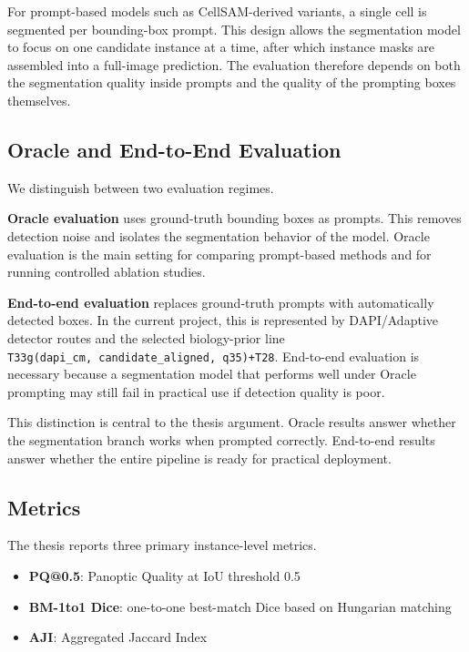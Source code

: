 For prompt-based models such as CellSAM-derived variants, a single cell is segmented per bounding-box prompt. This design allows the segmentation model to focus on one candidate instance at a time, after which instance masks are assembled into a full-image prediction. The evaluation therefore depends on both the segmentation quality inside prompts and the quality of the prompting boxes themselves.

\subsection{Oracle and End-to-End Evaluation}\label{oracle-and-end-to-end-evaluation}

We distinguish between two evaluation regimes.

\textbf{Oracle evaluation} uses ground-truth bounding boxes as prompts. This removes detection noise and isolates the segmentation behavior of the model. Oracle evaluation is the main setting for comparing prompt-based methods and for running controlled ablation studies.

\textbf{End-to-end evaluation} replaces ground-truth prompts with automatically detected boxes. In the current project, this is represented by DAPI/Adaptive detector routes and the selected biology-prior line \texttt{T33g(dapi\_cm,\ candidate\_aligned,\ q35)+T28}. End-to-end evaluation is necessary because a segmentation model that performs well under Oracle prompting may still fail in practical use if detection quality is poor.

This distinction is central to the thesis argument. Oracle results answer whether the segmentation branch works when prompted correctly. End-to-end results answer whether the entire pipeline is ready for practical deployment.

\subsection{Metrics}\label{metrics}

The thesis reports three primary instance-level metrics.

\begin{itemize}
\tightlist
\item
  \textbf{PQ@0.5}: Panoptic Quality at IoU threshold 0.5 \cite{kirillov2019pq}
\item
  \textbf{BM-1to1 Dice}: one-to-one best-match Dice based on Hungarian matching \cite{kuhn1955hungarian}
\item
  \textbf{AJI}: Aggregated Jaccard Index \cite{kumar2017aji}
\end{itemize}

